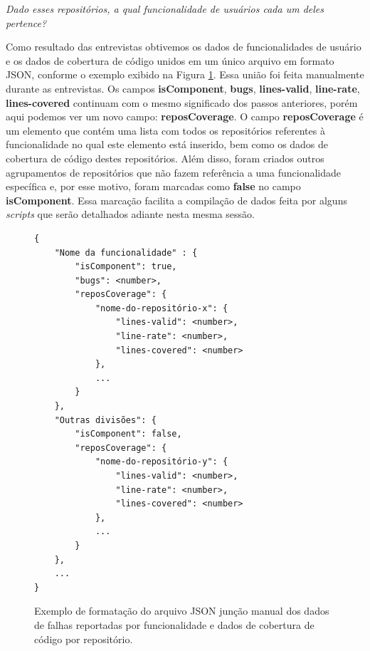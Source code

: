 \documentclass[11.5pt]{article}
\begin{document}
\begin{center}
\textit{Dado esses repositórios, a qual funcionalidade de usuários cada um deles pertence?}
\end{center}

Como resultado das entrevistas obtivemos os dados de funcionalidades de usuário e os dados de
cobertura de código unidos em um único arquivo em formato JSON, conforme o exemplo exibido na
Figura \ref{fig:formatoJsonFinal}.
Essa união foi feita manualmente durante as entrevistas.
Os campos \textbf{isComponent}, \textbf{bugs}, \textbf{lines-valid}, \textbf{line-rate},
\textbf{lines-covered} continuam com o mesmo significado dos passos anteriores, porém aqui podemos
ver um novo campo: \textbf{reposCoverage}.
O campo \textbf{reposCoverage} é um elemento que contém uma lista com todos os repositórios
referentes à funcionalidade no qual este elemento está inserido, bem como os dados de cobertura de
código destes repositórios.
Além disso, foram criados outros agrupamentos de repositórios que não fazem referência a uma
funcionalidade específica e, por esse motivo, foram marcadas como \textbf{false} no campo
\textbf{isComponent}.
Essa marcação facilita a compilação de dados feita por alguns \textit{scripts} que serão detalhados
adiante nesta mesma sessão.

\begin{figure}[ht]
\caption{Exemplo de formatação do arquivo JSON junção manual dos dados de falhas reportadas por
funcionalidade e dados de cobertura de código por repositório.}
\label{fig:formatoJsonFinal}
\begin{verbatim}
{
    "Nome da funcionalidade" : {
        "isComponent": true,
        "bugs": <number>,
        "reposCoverage": {
            "nome-do-repositório-x": {
                "lines-valid": <number>,
                "line-rate": <number>,
                "lines-covered": <number>
            },
            ...
        }
    },
    "Outras divisões": {
        "isComponent": false,
        "reposCoverage": {
            "nome-do-repositório-y": {
                "lines-valid": <number>,
                "line-rate": <number>,
                "lines-covered": <number>
            },
            ...
        }
    },
    ...
}
\end{verbatim}
\end{figure}
\end{document}
